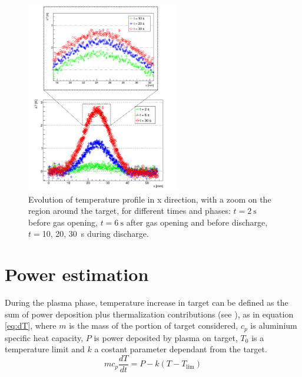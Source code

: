 \begin{figure}
 \centering
 \includegraphics[width=0.6\textwidth]{Images/Temperature/f5t4d4_profilo_tempi_zoom.png}
 \caption{Evolution of temperature profile in x direction, with a zoom on the region around the target, for different times and phases: $t = \SI{2}{\second}$ before gas opening, $t = \SI{6}{\second}$ after gas opening and before discharge, $t = $\num{10}, \num{20}, \SI{30}{\second} during discharge. }
 \label{fig:dis_profiles}
\end{figure}



\section{Power estimation}
During the plasma phase, temperature increase in target can be defined as the sum of power deposition plus thermalization contributions (see \cite{Pimazzoni2018}), as in equation \ref{eq:dT}, where $m$ is the mass of the portion of target considered, $c_p$ is aluminium specific heat capacity, $P$ is power deposited by plasma on target, $T_{0}$ is a temperature limit and $k$ a costant parameter dependant from the target.
\begin{equation}
 m c_p \frac{dT}{dt} = P - k(T-T_{\text{lim}})
 \label{eq:dT}
\end{equation}

